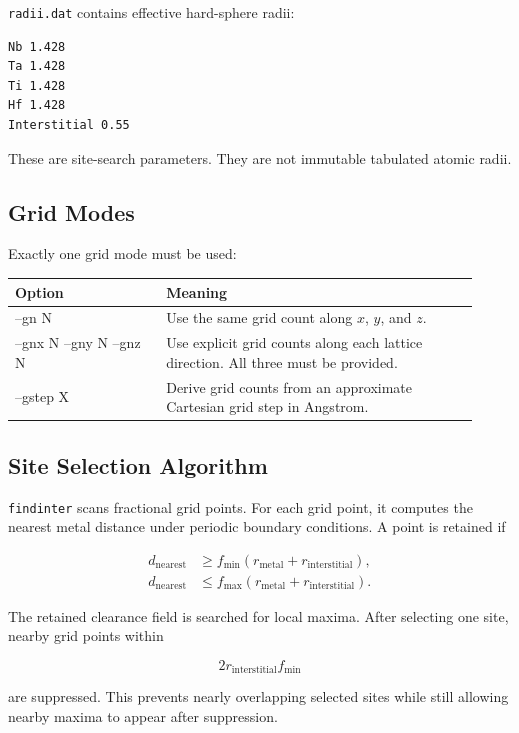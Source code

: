 \documentclass[11pt]{article}
\begin{document}
\texttt{radii.dat} contains effective hard-sphere radii:

\begin{lstlisting}
Nb 1.428
Ta 1.428
Ti 1.428
Hf 1.428
Interstitial 0.55
\end{lstlisting}

These are site-search parameters.
They are not immutable tabulated atomic radii.

\subsection{Grid Modes}

Exactly one grid mode must be used:

\begin{longtable}{>{\ttfamily}p{0.30\linewidth}p{0.62\linewidth}}
\toprule
Option & Meaning \\
\midrule
\endhead
--gn N & Use the same grid count along $x$, $y$, and $z$. \\
--gnx N --gny N --gnz N & Use explicit grid counts along each lattice direction. All three must be provided. \\
--gstep X & Derive grid counts from an approximate Cartesian grid step in Angstrom. \\
\bottomrule
\end{longtable}

\subsection{Site Selection Algorithm}

\texttt{findinter} scans fractional grid points.
For each grid point, it computes the nearest metal distance under periodic boundary conditions.
A point is retained if

\begin{align}
  d_{\mathrm{nearest}} &\ge
  f_{\min}(r_{\mathrm{metal}} + r_{\mathrm{interstitial}}),\\
  d_{\mathrm{nearest}} &\le
  f_{\max}(r_{\mathrm{metal}} + r_{\mathrm{interstitial}}).
\end{align}

The retained clearance field is searched for local maxima.
After selecting one site, nearby grid points within

\begin{equation}
  2 r_{\mathrm{interstitial}} f_{\min}
\end{equation}

are suppressed.
This prevents nearly overlapping selected sites while still allowing nearby maxima to appear after suppression.
\end{document}
